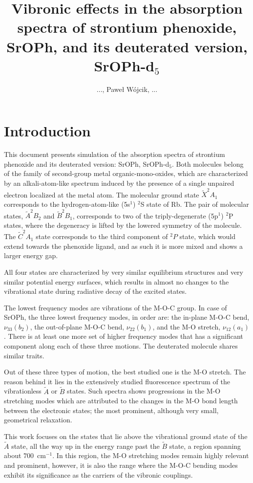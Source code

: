 \documentclass{article}
\title{
    Vibronic effects in the absorption spectra of strontium phenoxide, SrOPh,
    and its deuterated version, SrOPh-d$_5$
}
\author{..., Paweł Wójcik, ...}
\begin{document}
\maketitle

\section{Introduction}
\label{sec:intro}

This document presents simulation of the absorption spectra of strontium
phenoxide and its deuterated version: SrOPh, SrOPh-d$_5$. Both molecules belong of
the family of second-group metal organic-mono-oxides, which are characterized
by an alkali-atom-like spectrum induced by the presence of a single unpaired
electron localized at the metal atom. The molecular ground state $\tilde{X}^2 A
_1$ corresponds to the hydrogen-atom-like (5s$^1$) $^2$S state of Rb. The pair
of molecular states, $\tilde{A} ^2 B_{2}$ and $\tilde{B} ^2 B _{1}$,
corresponds to two of the triply-degenerate (5p$^1$) $^2$P states, where the
degeneracy is lifted by the lowered symmetry of the molecule. The $\tilde{C} ^2
A _1$ state corresponds to the third component of $^2 P$ state, which would
extend towards the phenoxide ligand, and as such it is more mixed and shows a
larger energy gap.

All four states are characterized by very similar equilibrium structures and
very similar potential energy surfaces, which results in almost no changes to
the vibrational state during radiative decay of the excited states. 

The lowest frequency modes are vibrations of the M-O-C group. In case of SrOPh,
the three lowest frequency modes, in order are: the in-plane M-O-C bend, $\nu
_{33} (b _2)$, the out-of-plane M-O-C bend, $\nu _{22} (b _1)$, and the M-O
stretch, $\nu _{12} (a _1)$. There is at least one more set of higher frequency
modes that has a significant component along each of these three motions. The
deuterated molecule shares similar traits.

Out of these three types of motion, the best studied one is the M-O stretch.
The reason behind it lies in the extensively studied fluorescence spectrum of
the vibrationless $\tilde{A}$ or $\tilde{B}$ states. Such spectra shows
progressions in the M-O stretching modes which are attributed to the changes in
the M-O bond length between the electronic states; the most prominent, although
very small, geometrical relaxation.

This work focuses on the states that lie above the vibrational ground state of
the $\tilde{A}$ state, all the way up in the energy range past the $\tilde{B}$
state, a region spanning about $700$~cm$^{-1}$. In this region, the M-O
stretching modes remain highly relevant and prominent, however, it is also the
range where the M-O-C bending modes exhibit its significance as the carriers of
the vibronic couplings. 
\end{document}
